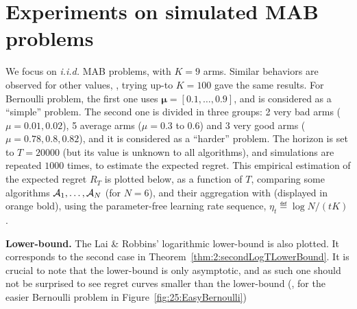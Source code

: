 \section{Experiments on simulated MAB problems}\label{sub:25:numExp}





We focus on \emph{i.i.d.} MAB problems, with $K = 9$ arms.
Similar behaviors are observed for other values, \eg, trying up-to $K = 100$ gave the same results.
For Bernoulli problem, the first one uses $\boldsymbol{\mu}=[0.1,\dots,0.9]$, and is considered as a ``simple'' problem.
The second one is divided in three groups:
2 very bad arms ($\mu = 0.01, 0.02$), 5 average arms ($\mu = 0.3$ to $0.6$) and 3 very good arms ($\mu = 0.78, 0.8, 0.82$), and it is considered as a ``harder'' problem.
The horizon is set to $T = 20000$ (but its value is unknown to all algorithms), and simulations are repeated $1000$ times, to estimate the expected regret.
%
This empirical estimation of the expected regret $R_T$ is plotted below,
as a function of $T$, comparing some algorithms $\mathcal{A}_1,\dots,\mathcal{A}_N$ (for $N=6$), and their aggregation with \Aggr{} (displayed in orange bold),
using the parameter-free learning rate sequence, $\eta_t \eqdef \log{N} / (t K)$.

\textbf{Lower-bound.}
%
The Lai \& Robbins' logarithmic lower-bound \cite{LaiRobbins85} is also plotted. It corresponds to the second case in Theorem~\ref{thm:2:secondLogTLowerBound}. It is crucial to note that the lower-bound is only asymptotic, and as such one should not be surprised to see regret curves smaller than the lower-bound (\eg, for the easier Bernoulli problem in Figure~\ref{fig:25:EasyBernoulli})


